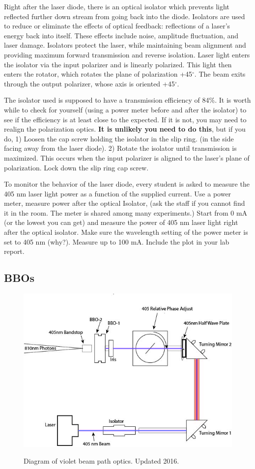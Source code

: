 \documentclass{../lab}
\begin{document}
Right after the laser diode, there is an optical isolator which prevents light reflected further down stream from going back into the diode. Isolators are used to reduce or eliminate the effects of optical feedback: reflections of a laser’s energy back into itself. These effects include noise, amplitude fluctuation, and laser damage. Isolators protect the laser, while maintaining beam alignment and providing maximum forward transmission and reverse isolation. Laser light enters the isolator via the input polarizer and is linearly polarized. This light then enters the rotator, which rotates the plane of polarization +45$^\circ$. The beam exits through the output polarizer, whose axis is oriented +45$^\circ$.

The isolator used is supposed to have a transmission efficiency of 84\%. It is worth while to check for yourself (using a power meter before and after the isolator) to see if the efficiency is at least close to the expected. If it is not, you may need to realign the polarization optics. \textbf{It is unlikely you need to do this}, but if you do, 1) Loosen the cap screw holding the isolator in the slip ring. (in the side facing away from the laser diode). 2) Rotate the isolator until transmission is maximized. This occurs when the input polarizer is aligned to the laser’s plane of polarization. Lock down the slip ring cap screw.

To monitor the behavior of the laser diode, every student is asked to measure the 405 nm laser light power as a function of the supplied current. Use a power meter, measure power after the optical Isolator, (ask the staff if you cannot find it in the room. The meter is shared among many experiments.) Start from 0 mA (or the lowest you can get) and measure the power of 405 nm laser light right after the optical isolator. Make sure the wavelength setting of the power meter is set to 405 nm (why?). Measure up to 100 mA. Include the plot in your lab report.

\subsection{BBOs}

\begin{figure}[h]
    \centering
    \href{http://experimentationlab.berkeley.edu/sites/default/files/violetbeamdiagram2.jpg}{\includegraphics[width=0.5\linewidth]{images/violetbeamdiagram2.jpg}}
    \caption{Diagram of violet beam path optics. Updated 2016.}
\end{figure}
\end{document}
